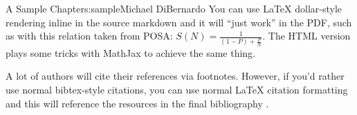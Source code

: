 \begin{aosachapter}{A Sample Chapter}{s:sample}{Michael DiBernardo}
You can use LaTeX dollar-style rendering inline in the source markdown
and it will ``just work'' in the PDF, such as with this relation taken
from POSA: $S(N) = \frac{1}{(1 - P) + \frac{P}{N}}$. The HTML version
plays some tricks with MathJax to achieve the same thing.

A lot of authors will cite their references via footnotes. However, if
you'd rather use normal bibtex-style citations, you can use normal LaTeX
citation formatting and this will reference the resources in the final
bibliography \cite{Schmidt:02g}.

\end{aosachapter}
